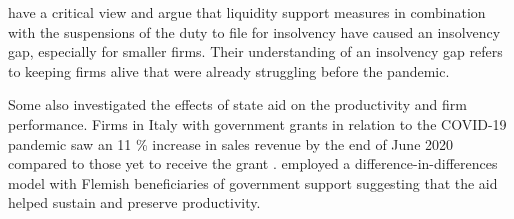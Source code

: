 \parencite{dorr_small_2022} have a critical view and argue that liquidity support measures in combination with the suspensions of the duty to file for insolvency have caused an insolvency gap, especially for smaller firms. Their understanding of an insolvency gap refers to keeping firms alive that were already struggling before the pandemic.

Some also investigated the effects of state aid on the productivity and firm performance. Firms in Italy with government grants in relation to the COVID-19 pandemic saw an 11 \% increase in sales revenue by the end of June 2020 compared to those yet to receive the grant \parencite{turkson_government_2021}. \parencite{konings_impact_2022} employed a difference-in-differences model with Flemish beneficiaries of government support suggesting that the aid helped sustain and preserve productivity.